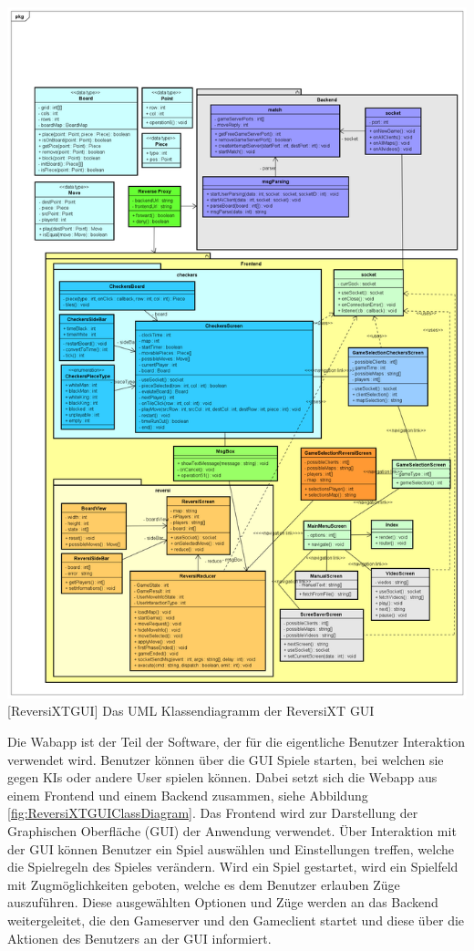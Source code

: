 \documentclass[12pt,a4paper,bibliography=totocnumbered,listof=totocnumbered]{article}
\begin{document}
\vspace{1em}
\begin{minipage}{\linewidth}
	\centering
	\includegraphics[width=0.9\linewidth]{pics/ReversiXTGUIClassDiagramm.png}
	[ReversiXTGUI]{ Das UML Klassendiagramm der ReversiXT GUI }
	\label{fig:ReversiXTGUIClassDiagram}
\end{minipage}

Die Wabapp ist der Teil der Software, der für die eigentliche Benutzer Interaktion verwendet wird. Benutzer können über die GUI
Spiele starten, bei welchen sie gegen KIs oder andere User spielen können. Dabei setzt sich die Webapp aus einem Frontend und 
einem Backend zusammen, siehe Abbildung \ref{fig:ReversiXTGUIClassDiagram}. 
Das Frontend wird zur Darstellung der Graphischen Oberfläche (GUI) der Anwendung verwendet. Über Interaktion mit der 
GUI können Benutzer ein Spiel auswählen und Einstellungen treffen, welche die Spielregeln des Spieles verändern.
Wird ein Spiel gestartet, wird ein Spielfeld mit Zugmöglichkeiten geboten, welche es dem Benutzer erlauben 
Züge auszuführen.
Diese ausgewählten Optionen und Züge werden an das Backend weitergeleitet, die den Gameserver und den Gameclient 
startet und diese über die Aktionen des Benutzers an der GUI informiert. 
\end{document}
